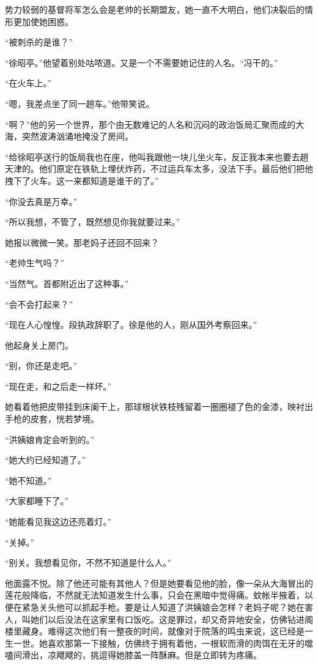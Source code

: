 \par 势力较弱的基督将军怎么会是老帅的长期盟友，她一直不大明白，他们决裂后的情形更加使她困惑。
\par “被刺杀的是谁？”
\par “徐昭亭。”他望着别处咕哝道。又是一个不需要她记住的人名。“冯干的。”
\par “在火车上。”
\par “嗯，我差点坐了同一趟车。”他带笑说。
\par “啊？”他的另一个世界，那个由无数难记的人名和沉闷的政治饭局汇聚而成的大海，突然波涛汹涌地掩没了房间。
\par “给徐昭亭送行的饭局我也在座，他叫我跟他一块儿坐火车，反正我本来也要去趟天津的。他们原定在铁轨上埋伏炸药，不过运兵车太多，没法下手。最后他们把他拽下了火车。这一来都知道是谁干的了。”
\par “你没去真是万幸。”
\par “所以我想，不管了，既然想见你我就要过来。”
\par 她报以微微一笑。那老妈子还回不回来？
\par “老帅生气吗？”
\par “当然气。首都附近出了这种事。”
\par “会不会打起来？”
\par “现在人心惶惶。段执政辞职了。徐是他的人，刚从国外考察回来。”
\par 他起身关上房门。
\par “别，你还是走吧。”
\par “现在走，和之后走一样坏。”
\par 她看着他把皮带挂到床阑干上，那球根状铁枝残留着一圈圈褪了色的金漆，映衬出手枪的皮套，恍若梦境。
\par “洪姨娘肯定会听到的。”
\par “她大约已经知道了。”
\par “她不知道。”
\par “大家都睡下了。”
\par “她能看见我这边还亮着灯。”
\par “关掉。”
\par “别关。我想看见你，不然不知道是什么人。”
\par 他面露不悦。除了他还可能有其他人？但是她要看见他的脸，像一朵从大海冒出的莲花般降临，不然就无法知道发生什么事，只会在黑暗中觉得痛。蚊帐半掖着，以便在紧急关头他可以抓起手枪。要是让人知道了洪姨娘会怎样？老妈子呢？她在害人，叫她们以后没法在这家里有口饭吃。这是罪过，却又奇异地安全，仿佛钻进阁楼里藏身。难得这次他们有一整夜的时间，就像对于院落的鸣虫来说，这已经是一生一世。她喜欢那第一下接触，仿佛终于拥有着他，一根软而滑的肉饵在无牙的噬嗑间滑出，凉飕飕的，挑逗得她膝盖一阵酥麻。但是立即转为疼痛。
